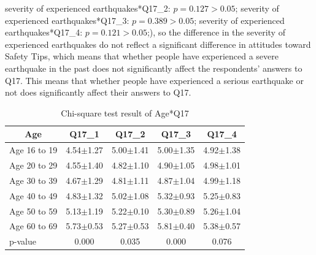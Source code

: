 severity of experienced earthquakes*Q17\_2: $p=0.127>0.05$; severity of experienced earthquakes*Q17\_3: $p=0.389>0.05$; severity of experienced earthquakes*Q17\_4: $p=0.121>0.05$;), so the difference in the severity of experienced earthquakes do not reflect a significant difference in attitudes toward Safety Tips, which means that whether people have experienced a severe earthquake in the past does not significantly affect the respondents' answers to Q17. This means that whether people have experienced a serious earthquake or not does significantly affect their answers to Q17.

\begin{table}[h]
  \caption{Chi-square test result of Age*Q17}
  \label{table32a}
  \centering
  \begin{tabular}{l|cccc}
 \hline
        \multicolumn{1}{c|}{Age}          & Q17\_1               & Q17\_2 & Q17\_3    & Q17\_4      \\
\hline
Age 16 to 19 & 4.54$\pm$1.27                    & 5.00$\pm$1.41                    & 5.00$\pm$1.35                    & 4.92$\pm$1.38                    \\
Age 20 to 29 & 4.55$\pm$1.40                    & 4.82$\pm$1.10                    & 4.90$\pm$1.05                    & 4.98$\pm$1.01                    \\
Age 30 to 39 & 4.67$\pm$1.29                    & 4.81$\pm$1.11                    & 4.87$\pm$1.04                    & 4.99$\pm$1.18                    \\
Age 40 to 49 & 4.83$\pm$1.32                    & 5.02$\pm$1.08                    & 5.32$\pm$0.93                    & 5.25$\pm$0.83                    \\
Age 50 to 59 & 5.13$\pm$1.19                    & 5.22$\pm$0.10                    & 5.30$\pm$0.89                    & 5.26$\pm$1.04                    \\
Age 60 to 69 & 5.73$\pm$0.53                    & 5.27$\pm$0.53                    & 5.81$\pm$0.40                    & 5.38$\pm$0.57                    \\
\hline
p-value&           0.000&         0.035&         0.000&   0.076     \\
 \hline
  \end{tabular}
\end{table}

